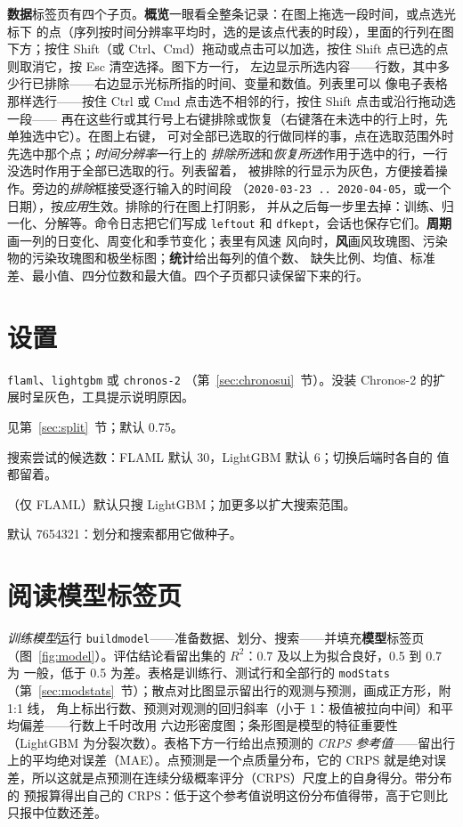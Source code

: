 \documentclass[11pt]{ctexrep}
\newcommand{\nosep}{\setlength{\itemsep}{0pt}\setlength{\parskip}{0pt}\setlength{\topsep}{2pt}}
\newcommand{\codeunderscore}{\textunderscore\allowbreak}
\newcommand{\code}[1]{\texttt{\let\_\codeunderscore #1}}
\newcommand{\tab}[1]{\textbf{#1}}
\begin{document}
\tab{数据}标签页有四个子页。\tab{概览}一眼看全整条记录：在图上拖选一段时间，或点选光标下
的点（序列按时间分辨率平均时，选的是该点代表的时段），里面的行列在图下方；按住 Shift（或
Ctrl、Cmd）拖动或点击可以加选，按住 Shift 点已选的点则取消它，按 Esc 清空选择。图下方一行，
左边显示所选内容——行数，其中多少行已排除——右边显示光标所指的时间、变量和数值。列表里可以
像电子表格那样选行——按住 Ctrl 或 Cmd 点击选不相邻的行，按住 Shift 点击或沿行拖动选一段——
再在这些行或其行号上右键排除或恢复（右键落在未选中的行上时，先单独选中它）。在图上右键，
可对全部已选取的行做同样的事，点在选取范围外时先选中那个点；\emph{时间分辨率}一行上的
\emph{排除所选}和\emph{恢复所选}作用于选中的行，一行没选时作用于全部已选取的行。列表留着，
被排除的行显示为灰色，方便接着操作。旁边的\emph{排除}框接受逐行输入的时间段
（\code{2020-03-23 .. 2020-04-05}，或一个日期），按\emph{应用}生效。排除的行在图上打阴影，
并从之后每一步里去掉：训练、归一化、分解等。命令日志把它们写成 \code{left\_out} 和
\code{df\_kept}，会话也保存它们。\tab{周期}画一列的日变化、周变化和季节变化；表里有风速
风向时，\tab{风}画风玫瑰图、污染物的污染玫瑰图和极坐标图；\tab{统计}给出每列的值个数、
缺失比例、均值、标准差、最小值、四分位数和最大值。四个子页都只读保留下来的行。

\section{设置}
\begin{description}\nosep
  \item[后端] \code{flaml}、\code{lightgbm} 或 \code{chronos-2}
        （第~\ref{sec:chronosui}~节）。没装 Chronos-2 的扩展时呈灰色，工具提示说明原因。
  \item[划分方法、训练集比例] 见第~\ref{sec:split}~节；默认 0.75。
  \item[搜索次数] 搜索尝试的候选数：FLAML 默认 30，LightGBM 默认 6；切换后端时各自的
        值都留着。
  \item[估计器]（仅 FLAML）默认只搜 LightGBM；加更多以扩大搜索范围。
  \item[随机种子] 默认 7654321：划分和搜索都用它做种子。
\end{description}

\section{阅读模型标签页}
\emph{训练模型}运行 \code{build\_model}——准备数据、划分、搜索——并填充\tab{模型}标签页
（图~\ref{fig:model}）。评估结论看留出集的 $R^2$：0.7 及以上为拟合良好，0.5 到 0.7 为
一般，低于 0.5 为差。表格是训练行、测试行和全部行的 \code{modStats}
（第~\ref{sec:modstats}~节）；散点对比图显示留出行的观测与预测，画成正方形，附 1:1 线，
角上标出行数、预测对观测的回归斜率（小于 1：极值被拉向中间）和平均偏差——行数上千时改用
六边形密度图；条形图是模型的特征重要性（LightGBM 为分裂次数）。表格下方一行给出点预测的
\emph{CRPS 参考值}——留出行上的平均绝对误差（MAE）。点预测是一个点质量分布，它的
CRPS 就是绝对误差，所以这就是点预测在连续分级概率评分（CRPS）尺度上的自身得分。带分布的
预报算得出自己的 CRPS：低于这个参考值说明这份分布值得带，高于它则比只报中位数还差。
\end{document}
